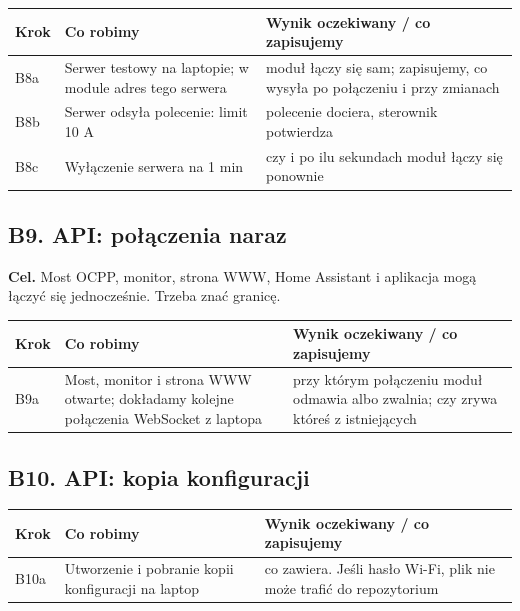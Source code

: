 \documentclass[11pt,a4paper]{article}
\begin{document}
\begin{longtable}{>{\raggedright\arraybackslash}p{3.00cm}>{\raggedright\arraybackslash}p{4.90cm}>{\raggedright\arraybackslash}p{7.38cm}}
\toprule
\rowcolor{apteallight}\textbf{Krok} & \textbf{Co robimy} & \textbf{Wynik oczekiwany / co zapisujemy} \\
\midrule\endhead
\bottomrule\endfoot
B8a & Serwer testowy na laptopie; w module adres tego serwera & moduł łączy się sam; zapisujemy, co wysyła po połączeniu i przy zmianach \\
B8b & Serwer odsyła polecenie: limit 10 A & polecenie dociera, sterownik potwierdza \\
B8c & Wyłączenie serwera na 1 min & czy i po ilu sekundach moduł łączy się ponownie \\
\end{longtable}

\subsection{B9. API: połączenia naraz}

\textbf{Cel.} Most OCPP, monitor, strona WWW, Home Assistant i aplikacja mogą łączyć się jednocześnie. Trzeba znać granicę.


\begin{longtable}{>{\raggedright\arraybackslash}p{3.00cm}>{\raggedright\arraybackslash}p{5.52cm}>{\raggedright\arraybackslash}p{6.76cm}}
\toprule
\rowcolor{apteallight}\textbf{Krok} & \textbf{Co robimy} & \textbf{Wynik oczekiwany / co zapisujemy} \\
\midrule\endhead
\bottomrule\endfoot
B9a & Most, monitor i strona WWW otwarte; dokładamy kolejne połączenia WebSocket z laptopa & przy którym połączeniu moduł odmawia albo zwalnia; czy zrywa któreś z istniejących \\
\end{longtable}

\subsection{B10. API: kopia konfiguracji}

\begin{longtable}{>{\raggedright\arraybackslash}p{3.00cm}>{\raggedright\arraybackslash}p{4.59cm}>{\raggedright\arraybackslash}p{7.69cm}}
\toprule
\rowcolor{apteallight}\textbf{Krok} & \textbf{Co robimy} & \textbf{Wynik oczekiwany / co zapisujemy} \\
\midrule\endhead
\bottomrule\endfoot
B10a & Utworzenie i pobranie kopii konfiguracji na laptop & co zawiera. Jeśli hasło Wi-Fi, plik nie może trafić do repozytorium \\
\end{longtable}
\end{document}
